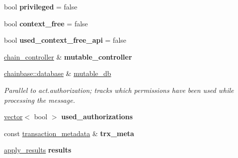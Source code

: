 \begin{DoxyCompactItemize}
bool {\bfseries privileged} = false
\item 
\mbox{\label{classaacio_1_1chain_1_1apply__context_a5113e22ef9c4a151d7af2c33cc99f94b}} 
bool {\bfseries context\+\_\+free} = false
\item 
\mbox{\label{classaacio_1_1chain_1_1apply__context_ac9a994ce9691049b070bc5f352290dcd}} 
bool {\bfseries used\+\_\+context\+\_\+free\+\_\+api} = false
\item 
\mbox{\label{classaacio_1_1chain_1_1apply__context_af3fff480198dd1bfd800cf00164ffc42}} 
\mbox{\hyperlink{classaacio_1_1chain_1_1chain__controller}{chain\+\_\+controller}} \& {\bfseries mutable\+\_\+controller}
\item 
\mbox{\label{classaacio_1_1chain_1_1apply__context_abf616d1ac7352efe7da77a3d388fa444}} 
\mbox{\hyperlink{classchainbase_1_1database}{chainbase\+::database}} \& \mbox{\hyperlink{classaacio_1_1chain_1_1apply__context_abf616d1ac7352efe7da77a3d388fa444}{mutable\+\_\+db}}
\begin{DoxyCompactList}\small\item\em Parallel to act.\+authorization; tracks which permissions have been used while processing the message. \end{DoxyCompactList}\item 
\mbox{\label{classaacio_1_1chain_1_1apply__context_a7c923832ad64fb1fc15e8633c878c5b5}} 
\mbox{\hyperlink{classstd_1_1vector}{vector}}$<$ bool $>$ {\bfseries used\+\_\+authorizations}
\item 
\mbox{\label{classaacio_1_1chain_1_1apply__context_a97d0d818ff5aac91b1f14e4be1c5ad48}} 
const \mbox{\hyperlink{classaacio_1_1chain_1_1transaction__metadata}{transaction\+\_\+metadata}} \& {\bfseries trx\+\_\+meta}
\item 
\mbox{\label{classaacio_1_1chain_1_1apply__context_aecf270500f688071c65869f4647c2b2f}} 
\mbox{\hyperlink{structaacio_1_1chain_1_1apply__context_1_1apply__results}{apply\+\_\+results}} {\bfseries results}

\end{DoxyCompactItemize}
